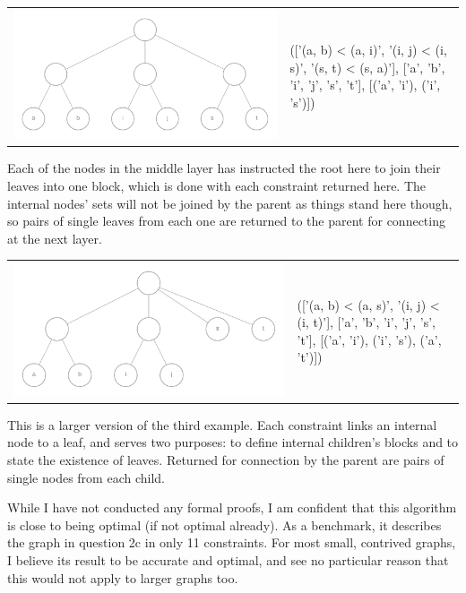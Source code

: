 \documentclass[11pt]{article} %
\begin{document}
\begin{center}
\begin{tabular}{>{\centering}m{} >{\centering\arraybackslash}m{}}
	\includegraphics[scale=0.1]{traverse4} & (['(a, b) < (a, i)', '(i, j) < (i, s)', '(s, t) < (s, a)'], ['a', 'b', 'i', 'j', 's', 't'], [('a', 'i'), ('i', 's')])
\end{tabular}
\end{center}
Each of the nodes in the middle layer has instructed the root here to join their leaves into one block, which is done with each constraint returned here. The internal nodes' sets will not be joined by the parent as things stand here though, so pairs of single leaves from each one are returned to the parent for connecting at the next layer.

\hfill

\begin{center}
\begin{tabular}{>{\centering}m{} >{\centering\arraybackslash}m{}}
	\includegraphics[scale=0.1]{traverse5} & (['(a, b) < (a, s)', '(i, j) < (i, t)'], ['a', 'b', 'i', 'j', 's', 't'], [('a', 'i'), ('i', 's'), ('a', 't')])
\end{tabular}
\end{center}

This is a larger version of the third example. Each constraint links an internal node to a leaf, and serves two purposes: to define internal children's blocks and to state the existence of leaves. Returned for connection by the parent are pairs of single nodes from each child.

\hfill

While I have not conducted any formal proofs, I am confident that this algorithm is close to being optimal (if not optimal already). As a benchmark, it describes the graph in question 2c in only 11 constraints. For most small, contrived graphs, I believe its result to be accurate and optimal, and see no particular reason that this would not apply to larger graphs too.
\end{document}
